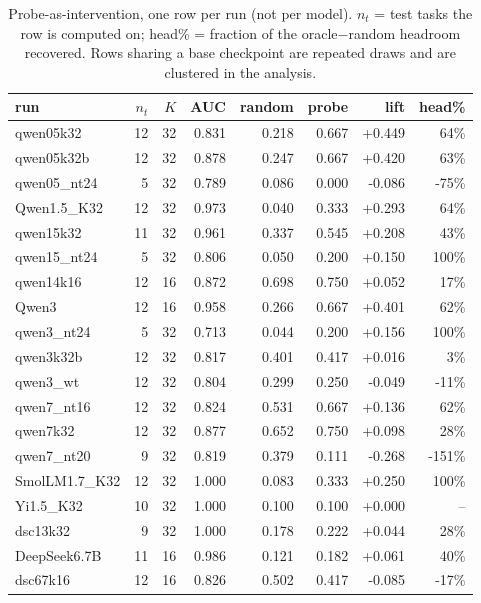 \begin{table}[h]\centering\footnotesize
\caption{Probe-as-intervention, one row per run (not per model). $n_t$ = test tasks the row is computed on;
head\% = fraction of the oracle$-$random headroom recovered. Rows sharing a base checkpoint are repeated draws
and are clustered in the analysis.}
\begin{tabular}{lrrrrrrr}
\toprule
run & $n_t$ & $K$ & AUC & random & probe & lift & head\% \\
\midrule
qwen05k32 & 12 & 32 & 0.831 & 0.218 & 0.667 & +0.449 & 64\% \\
qwen05k32b & 12 & 32 & 0.878 & 0.247 & 0.667 & +0.420 & 63\% \\
qwen05\_nt24 & 5 & 32 & 0.789 & 0.086 & 0.000 & -0.086 & -75\% \\
Qwen1.5\_K32 & 12 & 32 & 0.973 & 0.040 & 0.333 & +0.293 & 64\% \\
qwen15k32 & 11 & 32 & 0.961 & 0.337 & 0.545 & +0.208 & 43\% \\
qwen15\_nt24 & 5 & 32 & 0.806 & 0.050 & 0.200 & +0.150 & 100\% \\
qwen14k16 & 12 & 16 & 0.872 & 0.698 & 0.750 & +0.052 & 17\% \\
Qwen3 & 12 & 16 & 0.958 & 0.266 & 0.667 & +0.401 & 62\% \\
qwen3\_nt24 & 5 & 32 & 0.713 & 0.044 & 0.200 & +0.156 & 100\% \\
qwen3k32b & 12 & 32 & 0.817 & 0.401 & 0.417 & +0.016 & 3\% \\
qwen3\_wt & 12 & 32 & 0.804 & 0.299 & 0.250 & -0.049 & -11\% \\
qwen7\_nt16 & 12 & 32 & 0.824 & 0.531 & 0.667 & +0.136 & 62\% \\
qwen7k32 & 12 & 32 & 0.877 & 0.652 & 0.750 & +0.098 & 28\% \\
qwen7\_nt20 & 9 & 32 & 0.819 & 0.379 & 0.111 & -0.268 & -151\% \\
SmolLM1.7\_K32 & 12 & 32 & 1.000 & 0.083 & 0.333 & +0.250 & 100\% \\
Yi1.5\_K32 & 10 & 32 & 1.000 & 0.100 & 0.100 & +0.000 & -- \\
dsc13k32 & 9 & 32 & 1.000 & 0.178 & 0.222 & +0.044 & 28\% \\
DeepSeek6.7B & 11 & 16 & 0.986 & 0.121 & 0.182 & +0.061 & 40\% \\
dsc67k16 & 12 & 16 & 0.826 & 0.502 & 0.417 & -0.085 & -17\% \\
\bottomrule
\end{tabular}\end{table}

